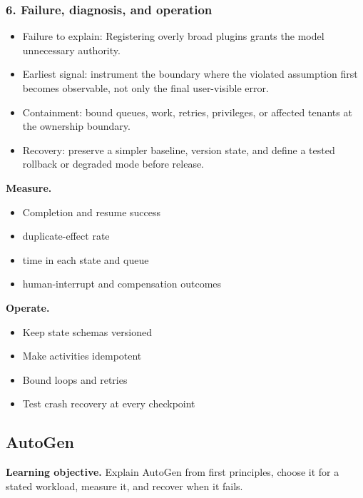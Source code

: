\subsubsection*{6. Failure, diagnosis, and operation}
\begin{itemize}
\item Failure to explain: Registering overly broad plugins grants the model unnecessary authority.
\item Earliest signal: instrument the boundary where the violated assumption first becomes observable, not only the final user-visible error.
\item Containment: bound queues, work, retries, privileges, or affected tenants at the ownership boundary.
\item Recovery: preserve a simpler baseline, version state, and define a tested rollback or degraded mode before release.
\end{itemize}
\textbf{Measure.}\begin{itemize}
\item Completion and resume success
\item duplicate-effect rate
\item time in each state and queue
\item human-interrupt and compensation outcomes
\end{itemize}
\textbf{Operate.}\begin{itemize}
\item Keep state schemas versioned
\item Make activities idempotent
\item Bound loops and retries
\item Test crash recovery at every checkpoint
\end{itemize}
\subsection{AutoGen}
\textbf{Learning objective.} Explain AutoGen from first principles, choose it for a stated workload, measure it, and recover when it fails.
